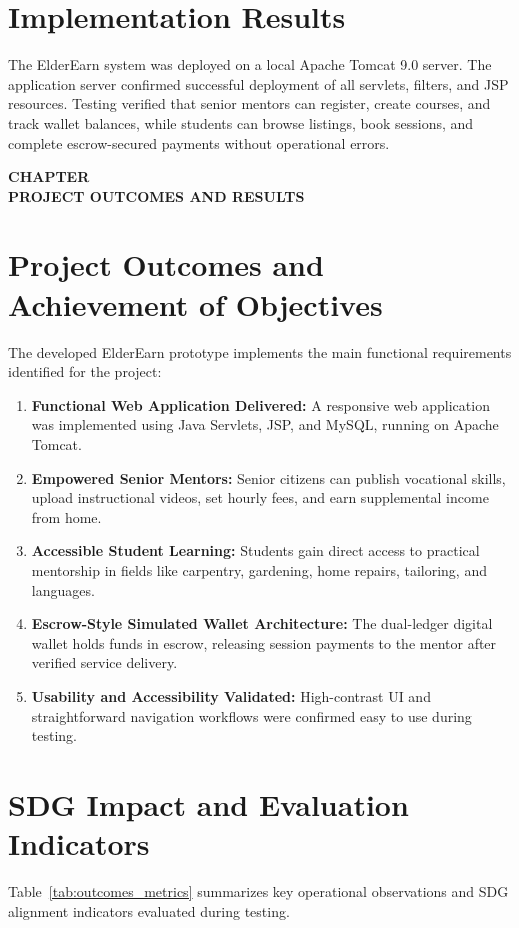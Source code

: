 \documentclass[12pt,a4paper]{report}
\newcommand{\chaptertitlepage}[1]{%
  \clearpage
  \thispagestyle{empty}
  \null
  \vfill
  \begin{center}
    {\fontsize{16pt}{18pt}\selectfont\bfseries CHAPTER \thechapter}\\[0.5cm]
    {\fontsize{16pt}{18pt}\selectfont\bfseries #1}
  \end{center}
  \vfill
  \null
  \clearpage
  \setcounter{section}{0}
}
\begin{document}
\section{Implementation Results}
The ElderEarn system was deployed on a local Apache Tomcat 9.0 server. The application server confirmed successful deployment of all servlets, filters, and JSP resources. Testing verified that senior mentors can register, create courses, and track wallet balances, while students can browse listings, book sessions, and complete escrow-secured payments without operational errors.

\chaptertitlepage{PROJECT OUTCOMES AND RESULTS}

\section{Project Outcomes and Achievement of Objectives}
The developed ElderEarn prototype implements the main functional requirements identified for the project:
\begin{enumerate}[leftmargin=1.5em, itemsep=2pt]
  \item \textbf{Functional Web Application Delivered:} A responsive web application was implemented using Java Servlets, JSP, and MySQL, running on Apache Tomcat.
  \item \textbf{Empowered Senior Mentors:} Senior citizens can publish vocational skills, upload instructional videos, set hourly fees, and earn supplemental income from home.
  \item \textbf{Accessible Student Learning:} Students gain direct access to practical mentorship in fields like carpentry, gardening, home repairs, tailoring, and languages.
  \item \textbf{Escrow-Style Simulated Wallet Architecture:} The dual-ledger digital wallet holds funds in escrow, releasing session payments to the mentor after verified service delivery.
  \item \textbf{Usability and Accessibility Validated:} High-contrast UI and straightforward navigation workflows were confirmed easy to use during testing.
\end{enumerate}

\section{SDG Impact and Evaluation Indicators}
Table~\ref{tab:outcomes_metrics} summarizes key operational observations and SDG alignment indicators evaluated during testing.
\end{document}
